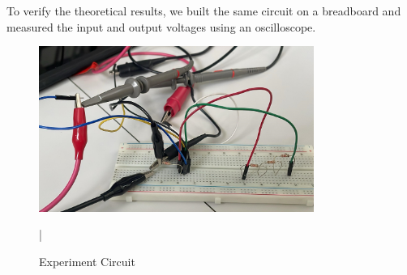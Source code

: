 To verify the theoretical results, we built the same circuit on a breadboard and measured the input and output voltages using an oscilloscope.

\begin{figure}[h]
    \centering
    \includegraphics[width=0.8\textwidth]{assets/p3-circuit.png}
    \caption{Experiment Circuit}
    \label{fig:p3-circuit}
|\end{figure}

